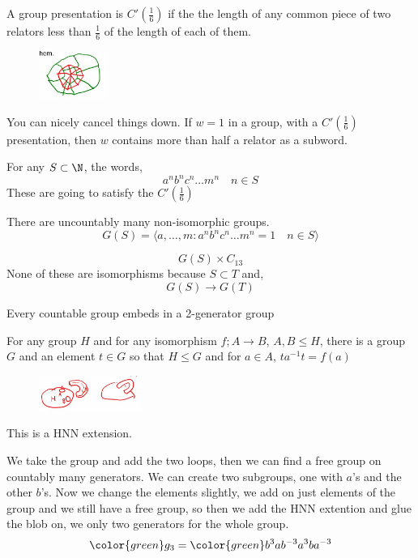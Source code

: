 \documentclass{article}
\begin{document}
A group presentation is $C'\left(\frac{1}{6} \right)$ if the the length of any common piece of two relators less than $\frac{1}{6}$ of the length of each of them.

\begin{figure}[!ht]
\centering
\includegraphics[width=0.2\textwidth]{./figures/L4.4}
\end{figure}

You can nicely cancel things down. If $w = 1$ in a group, with a $C'\left( \frac{1}{6}\right)$ presentation, then $w$ contains more than half a relator as a subword.


For any $S \subset \N$, the words,
$$ a^nb^nc^n \dots m^n \quad n \in S$$
These are going to satisfy the $C'\left( \frac{1}{6} \right)$


There are uncountably many non-isomorphic groups.
$$ G(S) = \langle a, \dots, m : a^nb^nc^n \dots m^n = 1 \quad n \in S \rangle $$

$$ G(S) \times C_{13} $$ %
None of these are isomorphisms because $S \subset T$ and,
$$ G(S) \to G(T) $$

\begin{nthm}[HNN]
  Every countable group embeds in a 2-generator group
\end{nthm}

For any group $H$ and for any isomorphism $f ; A \to B$, $A, B \le H$, there is a group $G$ and an element $t \in G$ so that $H \le G$ and for $a \in A$, $ta^{-1}t = f(a)$
\begin{figure}[!ht]
\centering
\includegraphics[width=0.3\textwidth]{./figures/L4.5}
\end{figure}
This is a HNN extension.

We take the group and add the two loops, then we can find a free group on countably many generators. We can create two subgroups, one with $a$'s and the other $b$'s. Now we change the elements slightly, we add on just elements of the group and we still have a free group, so then we add the HNN extention and glue the blob on, we only two generators for the whole group.
$$ {\color{green} g_3 } = {\color{green} b^3 a b^{-3}a^3 b a^{-3} } $$
\end{document}
